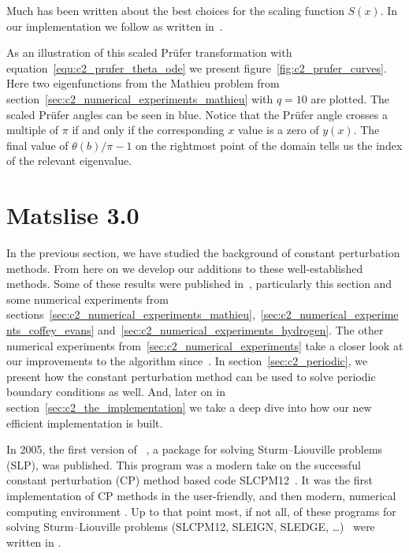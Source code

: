 Much has been written about the best choices for the scaling function $S(x)$. In our implementation we follow \matslise{} as written in~\cite{ledoux_study_2007}.

As an illustration of this scaled Prüfer transformation with equation~\eqref{equ:c2_prufer_theta_ode} we present figure~\ref{fig:c2_prufer_curves}. Here two eigenfunctions from the Mathieu problem from section~\ref{sec:c2_numerical_experiments_mathieu} with $q=10$ are plotted. The scaled Prüfer angles can be seen in blue. Notice that the Prüfer angle crosses a multiple of $\pi$ if and only if the corresponding $x$ value is a zero of $y(x)$. The final value of $\theta(b) / \pi - 1$ on the rightmost point of the domain tells us the index of the relevant eigenvalue.

\section{Matslise 3.0}\label{sec:c2_matslise3}

In the previous section, we have studied the background of constant perturbation methods. From here on we develop our additions to these well-established methods. Some of these results were published in~\cite{baeyens_fast_2020}, particularly this section and some numerical experiments from sections~\ref{sec:c2_numerical_experiments_mathieu},~\ref{sec:c2_numerical_experiments_coffey_evans} and~\ref{sec:c2_numerical_experiments_hydrogen}. The other numerical experiments from~\ref{sec:c2_numerical_experiments} take a closer look at our improvements to the algorithm since~\cite{baeyens_fast_2020}. In section~\ref{sec:c2_periodic}, we present how the constant perturbation method can be used to solve periodic boundary conditions as well. And, later on in section~\ref{sec:c2_the_implementation} we take a deep dive into how our new efficient implementation is built.

In 2005, the first version of \matslise{}~\cite{ledoux_cp_2004,ledoux_matslise_2005}, a \matlab{} package for solving Sturm--Liouville problems (SLP), was published. This program was a modern take on the successful constant perturbation (CP) method based code SLCPM12~\cite{ixaru_slcpm12_1999}. It was the first implementation of CP methods in the user-friendly, and then modern, numerical computing environment \matlab{}. Up to that point most, if not all, of these programs for solving Sturm--Liouville problems (SLCPM12, SLEIGN, SLEDGE, \dots)~\cite{ixaru_slcpm12_1999,bailey_sleign2_2001,eastham_sledge_1996} were written in \fortran{}.

